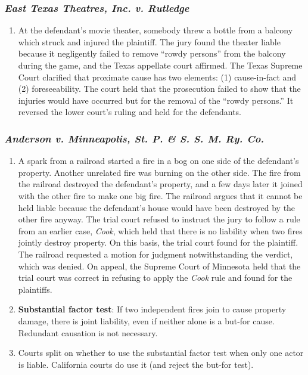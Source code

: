 \subsubsection{\emph{East Texas Theatres, Inc. v. Rutledge}}

\begin{enumerate}
    \item At the defendant's movie theater, somebody threw a bottle from a balcony which struck and injured the plaintiff. The jury found the theater liable because it negligently failed to remove ``rowdy persons'' from the balcony during the game, and the Texas appellate court affirmed. The Texas Supreme Court clarified that proximate cause has two elements: (1) cause-in-fact and (2) foreseeability. The court held that the prosecution failed to show that the injuries would have occurred but for the removal of the ``rowdy persons.'' It reversed the lower court's ruling and held for the defendants.
\end{enumerate}

\subsubsection{\emph{Anderson v. Minneapolis, St. P. \& S. S. M. Ry. Co.}}

\begin{enumerate}
    \item A spark from a railroad started a fire in a bog on one side of the defendant's property. Another unrelated fire was burning on the other side. The fire from the railroad destroyed the defendant's property, and a few days later it joined with the other fire to make one big fire. The railroad argues that it cannot be held liable because the defendant's house would have been destroyed by the other fire anyway. The trial court refused to instruct the jury to follow a rule from an earlier case, \emph{Cook}, which held that there is no liability when two fires jointly destroy property. On this basis, the trial court found for the plaintiff. The railroad requested a motion for judgment notwithstanding the verdict, which was denied. On appeal, the Supreme Court of Minnesota held that the trial court was correct in refusing to apply the \emph{Cook} rule and found for the plaintiffs.
    \item \textbf{Substantial factor test}: If two independent fires join to cause property damage, there is joint liability, even if neither alone is a but-for cause. Redundant causation is not necessary.
    \item Courts split on whether to use the substantial factor test when only one actor is liable. California courts do use it (and reject the but-for test).
\end{enumerate}

